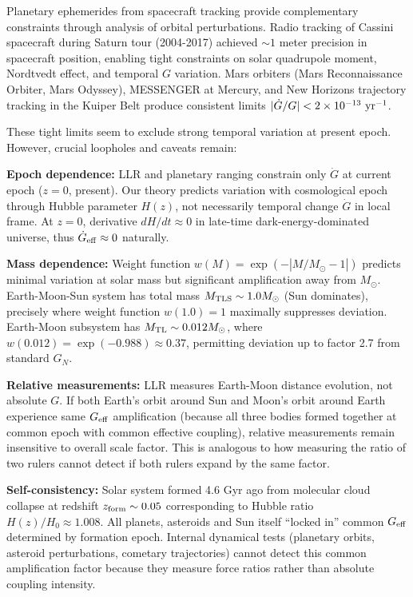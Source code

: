 \documentclass[10pt,a4paper]{article}
\begin{document}
Planetary ephemerides from spacecraft tracking provide complementary
constraints through analysis of orbital perturbations. Radio tracking of
Cassini spacecraft during Saturn tour (2004-2017) achieved \(\sim 1\)
meter precision in spacecraft position, enabling tight constraints on
solar quadrupole moment, Nordtvedt effect, and temporal \(G\) variation.
Mars orbiters (Mars Reconnaissance Orbiter, Mars Odyssey), MESSENGER at
Mercury, and New Horizons trajectory tracking in the Kuiper Belt produce
consistent limits \(|\dot{G}/G| < 2 \times 10^{-13}~{\rm yr^{-1}}\).

These tight limits seem to exclude strong temporal variation at present
epoch. However, crucial loopholes and caveats remain:

\textbf{Epoch dependence:} LLR and planetary ranging constrain only
\(\dot{G}\) at current epoch (\(z = 0\), present). Our theory predicts
variation with cosmological epoch through Hubble parameter \(H(z)\), not
necessarily temporal change \(\dot{G}\) in local frame. At \(z = 0\),
derivative \(dH/dt \approx 0\) in late-time dark-energy-dominated
universe, thus \(\dot{G}_{\rm eff} \approx 0\) naturally.

\textbf{Mass dependence:} Weight function
\(w(M) = \exp(-|M/M_\odot - 1|)\) predicts minimal variation at solar
mass but significant amplification away from \(M_\odot\). Earth-Moon-Sun
system has total mass \(M_{\rm TLS} \sim 1.0 M_\odot\) (Sun dominates),
precisely where weight function \(w(1.0) = 1\) maximally suppresses
deviation. Earth-Moon subsystem has \(M_{\rm TL} \sim 0.012 M_\odot\),
where \(w(0.012) = \exp(-0.988) \approx 0.37\), permitting deviation up
to factor 2.7 from standard \(G_N\).

\textbf{Relative measurements:} LLR measures Earth-Moon distance
evolution, not absolute \(G\). If both Earth's orbit around Sun and
Moon's orbit around Earth experience same \(G_{\rm eff}\) amplification
(because all three bodies formed together at common epoch with common
effective coupling), relative measurements remain insensitive to overall
scale factor. This is analogous to how measuring the ratio of two rulers
cannot detect if both rulers expand by the same factor.

\textbf{Self-consistency:} Solar system formed 4.6 Gyr ago from
molecular cloud collapse at redshift \(z_{\rm form} \sim 0.05\)
corresponding to Hubble ratio \(H(z)/H_0 \approx 1.008\). All planets,
asteroids and Sun itself ``locked in'' common \(G_{\rm eff}\) determined
by formation epoch. Internal dynamical tests (planetary orbits, asteroid
perturbations, cometary trajectories) cannot detect this common
amplification factor because they measure force ratios rather than
absolute coupling intensity.
\end{document}
